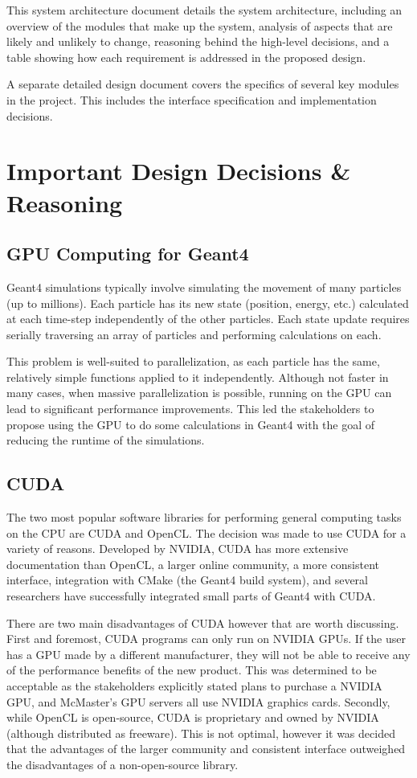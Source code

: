 \documentclass[12pt]{article}
\begin{document}
This system architecture document details the system architecture, including an overview of the modules that make up the system, analysis of aspects that are likely and unlikely to change, reasoning behind the high-level decisions, and a table showing how each requirement is addressed in the proposed design.

A separate detailed design document covers the specifics of several key modules in the project. This includes the interface specification and implementation decisions.

\section{Important Design Decisions \& Reasoning}
\subsection{GPU Computing for Geant4}\label{Sec_WhyGPU}
Geant4 simulations typically involve simulating the movement of many particles (up to millions). Each particle has its new state (position, energy, etc.) calculated at each time-step independently of the other particles. Each state update requires serially traversing an array of particles and performing calculations on each.

This problem is well-suited to parallelization, as each particle has the same, relatively simple functions applied to it independently. Although not faster in many cases, when massive parallelization is possible, running on the GPU can lead to significant performance improvements. This led the stakeholders to propose using the GPU to do some calculations in Geant4 with the goal of reducing the runtime of the simulations.

\subsection{CUDA}
The two most popular software libraries for performing general computing tasks on the CPU are CUDA and OpenCL. The decision was made to use CUDA for a variety of reasons. Developed by NVIDIA, CUDA has more extensive documentation than OpenCL, a larger online community, a more consistent interface, integration with CMake (the Geant4 build system), and several researchers have successfully integrated small parts of Geant4 with CUDA.

There are two main disadvantages of CUDA however that are worth discussing. First and foremost, CUDA programs can only run on NVIDIA GPUs. If the user has a GPU made by a different manufacturer, they will not be able to receive any of the performance benefits of the new product. This was determined to be acceptable as the stakeholders explicitly stated plans to purchase a NVIDIA GPU, and McMaster's GPU servers all use NVIDIA graphics cards. Secondly, while OpenCL is open-source, CUDA is proprietary and owned by NVIDIA (although distributed as freeware). This is not optimal, however it was decided that the advantages of the larger community and consistent interface outweighed the disadvantages of a non-open-source library.
\end{document}
